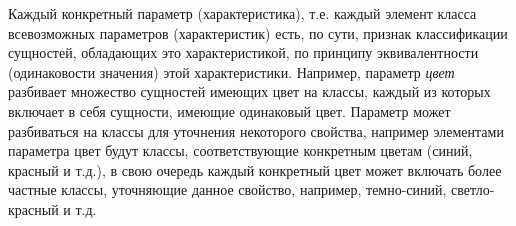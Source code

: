 \begin{SCn}
	
\begin{scnsubdividing}
\end{scnsubdividing}
\end{SCn}
		
Каждый конкретный параметр (характеристика), т.е. каждый элемент класса всевозможных параметров (характеристик) есть, по сути, признак классификации сущностей, обладающих это характеристикой, по принципу эквивалентности (одинаковости значения) этой характеристики. Например, параметр \textit{цвет} разбивает множество сущностей имеющих цвет на классы, каждый из которых включает в себя сущности, имеющие одинаковый цвет. Параметр может разбиваться на классы для уточнения некоторого свойства, например элементами параметра цвет будут классы, соответствующие конкретным цветам (синий, красный и т.д.), в свою очередь каждый конкретный цвет может включать более частные классы, уточняющие данное свойство, например, темно-синий, светло-красный и т.д.
		
